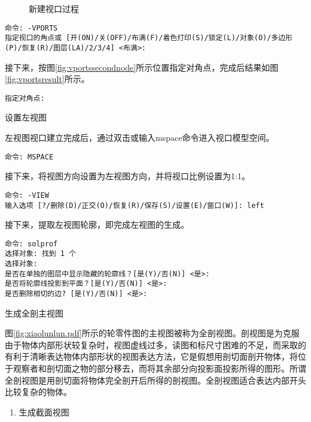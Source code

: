 \begin{procedure}
\begin{figure}[htbp]
\centering
{}\hspace{20pt}
\hspace{20pt}
\caption{新建视口过程}
\end{figure}
\begin{lstlisting}
命令: -VPORTS
指定视口的角点或 [开(ON)/关(OFF)/布满(F)/着色打印(S)/锁定(L)/对象(O)/多边形(P)/恢复(R)/图层(LA)/2/3/4] <布满>:
\end{lstlisting}

接下来，按图\ref{fig:vportssecondnode}所示位置指定对角点，完成后结果如图\ref{fig:vportsresult}所示。
\begin{lstlisting}
指定对角点:
\end{lstlisting}

\item 设置左视图

左视图视口建立完成后，通过双击或输入mspace命令进入视口模型空间。
\begin{lstlisting}
命令: MSPACE
\end{lstlisting}

接下来，将视图方向设置为左视图方向，并将视口比例设置为1:1。
\begin{lstlisting}
命令: -VIEW
输入选项 [?/删除(D)/正交(O)/恢复(R)/保存(S)/设置(E)/窗口(W)]: left
\end{lstlisting}

接下来，提取左视图轮廓，即完成左视图的生成。
\begin{lstlisting}
命令: solprof
选择对象: 找到 1 个
选择对象:
是否在单独的图层中显示隐藏的轮廓线？[是(Y)/否(N)] <是>:
是否将轮廓线投影到平面？[是(Y)/否(N)] <是>:
是否删除相切的边? [是(Y)/否(N)] <是>:
\end{lstlisting}

\item 生成全剖主视图

图\ref{fig:xiaolunlun.pdf}所示的轮零件图的主视图被称为全剖视图。剖视图是为克服由于物体内部形状较复杂时，视图虚线过多，读图和标尺寸困难的不足，而采取的有利于清晰表达物体内部形状的视图表达方法，它是假想用剖切面剖开物体，将位于观察者和剖切面之物的部分移去，而将其余部分向投影面投影所得的图形。所谓全剖视图是用剖切面将物体完全剖开后所得的剖视图。全剖视图适合表达内部开头比较复杂的物体。
\begin{enumerate}
\item 生成截面视图


\end{enumerate}
\end{procedure}
